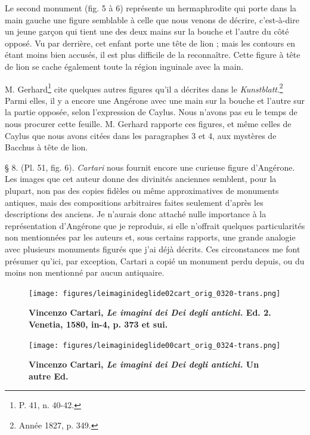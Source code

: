 \documentclass[a4paper, 11pt, oneside, polutonikogreek, french]{article}
\begin{document}
Le second monument (fig. 5 à 6) représente un hermaphrodite qui porte dans la main gauche une figure semblable à celle que nous venons de décrire, c'est-à-dire un jeune garçon qui tient une des deux mains sur la bouche et l'autre du côté opposé. Vu par derrière, cet enfant porte une tête de lion ; mais les contours en étant moins bien accusés, il est plus difficile de la reconnaître. Cette figure à tête de lion se cache également toute la région inguinale avec la main.

M. Gerhard\footnote{P. 41, n. 40-42.} cite quelques autres figures qu'il a décrites dans le \emph{Kunstblatt}.\footnote{Année 1827, p. 349.} Parmi elles, il y a encore une Angérone avec une main sur la bouche et l'autre sur la partie opposée, selon l'expression de Caylus. Nous n'avons pas eu le temps de nous procurer cette feuille. M. Gerhard rapporte ces figures, et même celles de Caylus que nous avons citées dans les paragraphes 3 et 4, aux mystères de Bacchus à tête de lion.

§ 8. (Pl. 51, fig. 6). \emph{Cartari} nous fournit encore une curieuse figure d'Angérone. Les images que cet auteur donne des divinités anciennes semblent, pour la plupart, non pas des copies fidèles ou même approximatives de monuments antiques, mais des compositions arbitraires faites seulement d'après les descriptions des anciens. Je n'aurais donc attaché nulle importance à la représentation d'Angérone que je reproduis, si elle n'offrait quelques particularités non mentionnées par les auteurs et, sous certains rapports, une grande analogie avec plusieurs monuments figurés que j'ai déjà décrits. Ces circonstances me font présumer qu'ici, par exception, Cartari a copié un monument perdu depuis, ou du moins non mentionné par aucun antiquaire.
\clearpage
\vspace*{\fill}
\begin{figure}[H]
\centering
\texttt{[image: figures/leimaginideglide02cart\_orig\_0320-trans.png]}
\caption{\bfseries Vincenzo Cartari, \emph{Le imagini dei Dei degli antichi.} Ed. 2. Venetia, 1580, in-4, p. 373 et sui.}
\end{figure}
\vspace*{\fill}
\clearpage
\vspace*{\fill}
\begin{figure}[H]
\centering
\texttt{[image: figures/leimaginideglide00cart\_orig\_0324-trans.png]}
\caption{\bfseries Vincenzo Cartari, \emph{Le imagini dei Dei degli antichi.} Un autre Ed.}
\end{figure}
\vspace*{\fill}
\clearpage
\end{document}
